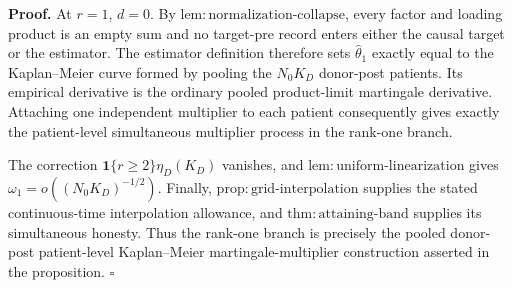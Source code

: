 \textbf{Proof.}
At \(r=1\), \(d=0\).  By
\(\mathrm{lem:normalization\mbox{-}collapse}\), every factor and loading
product is an empty sum and no target-pre record enters either the causal
target or the estimator.  The estimator definition therefore sets
\(\widehat\theta_1\) exactly equal to the Kaplan--Meier curve formed by
pooling the \(N_0K_D\) donor-post patients.  Its empirical derivative is
the ordinary pooled product-limit martingale derivative.  Attaching one
independent multiplier to each patient consequently gives exactly the
patient-level simultaneous multiplier process in the rank-one branch.

The correction \(\mathbf 1\{r\ge2\}\eta_D(K_D)\) vanishes, and
\(\mathrm{lem:uniform\mbox{-}linearization}\) gives
\(\omega_1=o((N_0K_D)^{-1/2})\).  Finally,
\(\mathrm{prop:grid\mbox{-}interpolation}\) supplies the stated
continuous-time interpolation allowance, and
\(\mathrm{thm:attaining\mbox{-}band}\) supplies its simultaneous honesty.
Thus the rank-one branch is precisely the pooled donor-post patient-level
Kaplan--Meier martingale-multiplier construction asserted in the
proposition. \(\square\)